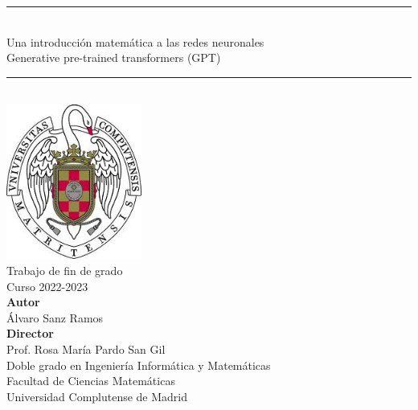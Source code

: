 \newpage
\thispagestyle{empty}

\begin{center}
    \rule{7cm}{1pt} \\
    \vspace*{0.2cm}
    \Large{Una introducción matemática a las redes neuronales} \\
    \large{Generative pre-trained transformers (GPT)}\\
    \rule{7cm}{1pt} \\
    \vspace*{1cm} 
    \includegraphics[height=2in]{figures/escudo.jpg} \\
    \vspace{0.75cm}
    \Large{Trabajo de fin de grado} \\
    \Large{Curso 2022-2023} \\
    \vspace{0.5cm}
    \large{\textbf{Autor}} \\
    \large{Álvaro Sanz Ramos} \\ 
    \vspace{0.25cm}
    \large{\textbf{Director}} \\
    \large{Prof. Rosa María Pardo San Gil} \\

    \vspace{0.75cm}
    Doble grado en Ingeniería Informática y Matemáticas \\
    Facultad de Ciencias Matemáticas \\
    Universidad Complutense de Madrid \\
    \vspace{1cm}
\end{center}
